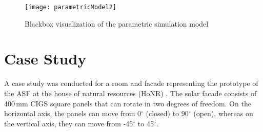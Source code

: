 			\begin{figure}[ht] %
				\begin{center}
				\texttt{[image: parametricModel2]}
				\caption{Blackbox visualization of the parametric simulation model}
				\label{fig:parametricModel}
				\end{center} 
			\end{figure}

	\section{Case Study}
	\label{s:caseStudy}

		A case study was conducted for a room and facade representing the prototype of the ASF at the house of natural resources (HoNR) \cite{nagy2016}.  The solar facade consists of 400\,mm CIGS square panels that can rotate in two degrees of freedom. On the horizontal axis, the panels can move from 0$^{\circ}$ (closed) to 90$^{\circ}$ (open), whereas on the vertical axis, they can move from -45$^{\circ}$ to 45$^{\circ}$. %



